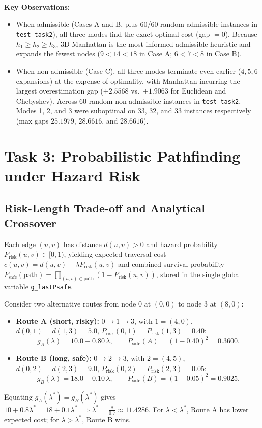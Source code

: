 \documentclass[11pt,a4paper]{article}
\begin{document}
\textbf{Key Observations:}
\begin{itemize}
    \item When admissible (Cases A and B, plus 60/60 random admissible instances in \texttt{test\_task2}), all three modes find the exact optimal cost (gap $= 0$). Because $h_1 \ge h_2 \ge h_3$, 3D Manhattan is the most informed admissible heuristic and expands the fewest nodes ($9 < 14 < 18$ in Case A; $6 < 7 < 8$ in Case B).
    \item When non-admissible (Case C), all three modes terminate even earlier ($4, 5, 6$ expansions) at the expense of optimality, with Manhattan incurring the largest overestimation gap ($+2.5568$ vs.\ $+1.9063$ for Euclidean and Chebyshev). Across 60 random non-admissible instances in \texttt{test\_task2}, Modes 1, 2, and 3 were suboptimal on 33, 32, and 33 instances respectively (max gaps $25.1979$, $28.6616$, and $28.6616$).
\end{itemize}

\section{Task 3: Probabilistic Pathfinding under Hazard Risk}

\subsection{Risk-Length Trade-off and Analytical Crossover}
Each edge $(u,v)$ has distance $d(u,v) > 0$ and hazard probability $P_{\text{risk}}(u,v) \in [0, 1)$, yielding expected traversal cost $c(u,v) = d(u,v) + \lambda P_{\text{risk}}(u,v)$ and combined survival probability $P_{\text{safe}}(\text{path}) = \prod_{(u,v)\in\text{path}} (1 - P_{\text{risk}}(u,v))$, stored in the single global variable \texttt{g\_lastPsafe}.

Consider two alternative routes from node $0$ at $(0,0)$ to node $3$ at $(8,0)$:
\begin{itemize}
    \item \textbf{Route A (short, risky):} $0 \to 1 \to 3$, with $1=(4,0)$, $d(0,1)=d(1,3)=5.0$, $P_{\text{risk}}(0,1)=P_{\text{risk}}(1,3)=0.40$:
    \[
        g_A(\lambda) = 10.0 + 0.80\,\lambda, \qquad P_{\text{safe}}(A) = (1 - 0.40)^2 = 0.3600.
    \]
    \item \textbf{Route B (long, safe):} $0 \to 2 \to 3$, with $2=(4,5)$, $d(0,2)=d(2,3)=9.0$, $P_{\text{risk}}(0,2)=P_{\text{risk}}(2,3)=0.05$:
    \[
        g_B(\lambda) = 18.0 + 0.10\,\lambda, \qquad P_{\text{safe}}(B) = (1 - 0.05)^2 = 0.9025.
    \]
\end{itemize}
Equating $g_A(\lambda^*) = g_B(\lambda^*)$ gives $10 + 0.8\lambda^* = 18 + 0.1\lambda^* \implies \lambda^* = \frac{8}{0.7} \approx 11.4286$. For $\lambda < \lambda^*$, Route A has lower expected cost; for $\lambda > \lambda^*$, Route B wins.
\end{document}
